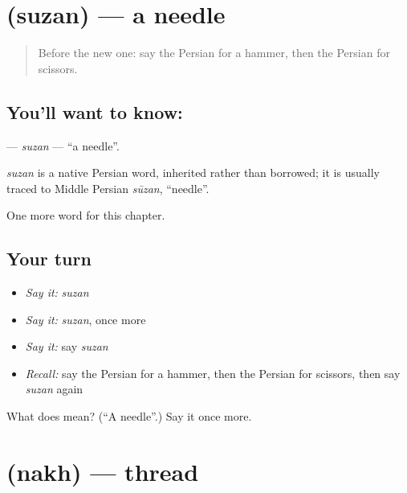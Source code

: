 \section[\texorpdfstring{\fa{سوزن} (suzan)}{سوزن (suzan)}]{ (suzan) — a needle}

\label{lesson:FA-C94-suzan}



\begin{quote}
Before the new one: say the Persian for a hammer, then the Persian for scissors.
\end{quote}

\subsection*{You'll want to know: }
\textbf{} — \emph{suzan} — \textquotedblleft{}a needle\textquotedblright{}.

\begin{cousinweb}
\emph{suzan} is a native Persian word, inherited rather than borrowed; it is usually traced to Middle Persian \emph{sūzan}, \textquotedblleft{}needle\textquotedblright{}.
\end{cousinweb}

\begin{grammarlens}[title={What you've built}]
One more word for this chapter.
\end{grammarlens}

\subsection*{Your turn}
\begin{itemize}
\raggedright
  \item \emph{Say it:} \emph{suzan}
  \item \emph{Say it:} \emph{suzan}, once more
  \item \emph{Say it:} say \emph{suzan}
  \item \emph{Recall:} say the Persian for a hammer, then the Persian for scissors, then say \emph{suzan} again
\end{itemize}

\begin{tcolorbox}[breakable,colback=teal!4,colframe=teal!35!black,title={Before you move on}]
What does  mean? (\textquotedblleft{}A needle\textquotedblright{}.) Say it once more.
\end{tcolorbox}
\section[\texorpdfstring{\fa{نخ} (nakh)}{نخ (nakh)}]{ (nakh) — thread}

